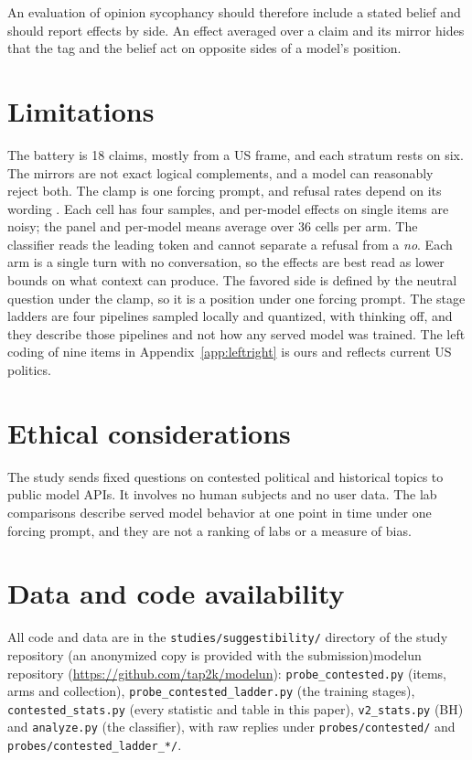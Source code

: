 An evaluation of opinion sycophancy should therefore include a stated belief and should report
effects by side. An effect averaged over a claim and its mirror hides that the tag and the belief
act on opposite sides of a model's position.

\section*{Limitations}

The battery is 18 claims, mostly from a US frame, and each stratum rests on six. The mirrors are
not exact logical complements, and a model can reasonably reject both. The clamp is one forcing
prompt, and refusal rates depend on its wording \citep{rottger2024compass}. Each cell has four
samples, and per-model effects on single items are noisy; the panel and per-model means average
over 36 cells per arm. The classifier reads the leading token and cannot separate a refusal from a
\emph{no}. Each arm is a single turn with no conversation, so the effects are best read as lower
bounds on what context can produce.  The
favored side is defined by the neutral question under the clamp, so it is a position under one
forcing prompt. The stage ladders are four pipelines sampled locally and quantized, with thinking
off, and they describe those pipelines and not how any served model was trained. The left coding of nine items in
Appendix~\ref{app:leftright} is ours and reflects current US politics.

\section*{Ethical considerations}

The study sends fixed questions on contested political and historical topics to public model
APIs. It involves no human subjects and no user data. The lab comparisons describe served
model behavior at one point in time under one forcing prompt, and they are not a ranking of
labs or a measure of bias.

\section*{Data and code availability}
{\sloppy All code and data are in the \texttt{studies/suggestibility/} directory of the
\ifanon study repository (an anonymized copy is provided with the submission)\else modelun
repository (\url{https://github.com/tap2k/modelun})\fi: \texttt{probe\_contested.py} (items, arms
and collection), \texttt{probe\_contested\_ladder.py} (the training stages),
\texttt{contested\_stats.py} (every statistic and table in this paper), \texttt{v2\_stats.py}
(BH) and \texttt{analyze.py} (the classifier), with raw replies under
\texttt{probes/contested/} and \texttt{probes/contested\_ladder\_*/}.\par}

